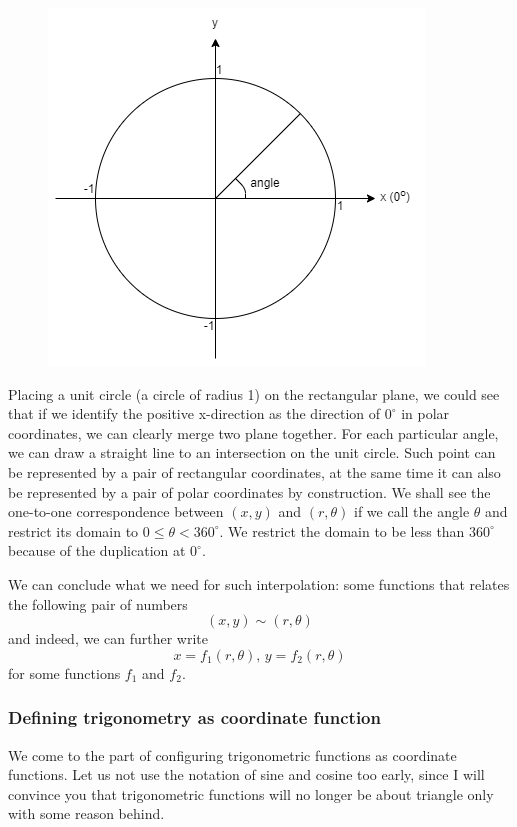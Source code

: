 \documentclass[12pt]{article}
\begin{document}
    \begin{figure}[H]
        \centering
        \includegraphics[scale=0.8]{rectpolar.png}
    \end{figure}

    Placing a unit circle (a circle of radius 1) on the rectangular plane, we could see that if we identify the positive x-direction as the direction of $0^\circ$ in polar coordinates, we can clearly merge two plane together. For each particular angle, we can draw a straight line to an intersection on the unit circle. Such point can be represented by a pair of rectangular coordinates, at the same time it can also be represented by a pair of polar coordinates by construction. We shall see the one-to-one correspondence between $(x,y)$ and $(r,\theta)$ if we call the angle $\theta$ and restrict its domain to $0\leq \theta < 360^\circ$. We restrict the domain to be less than $360^\circ$ because of the duplication at $0^\circ$.

    We can conclude what we need for such interpolation: some functions that relates the following pair of numbers $$(x,y)\sim (r,\theta)$$ and indeed, we can further write $$x=f_1(r,\theta), \, y=f_2(r,\theta)$$ for some functions $f_1$ and $f_2$.

    \subsubsection*{Defining trigonometry as coordinate function}

    We come to the part of configuring trigonometric functions as coordinate functions. Let us not use the notation of sine and cosine too early, since I will convince you that trigonometric functions will no longer be about triangle only with some reason behind.
\end{document}
